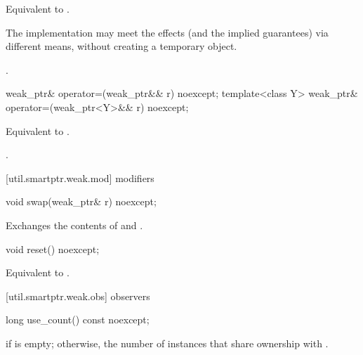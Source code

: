 \begin{itemdescr}
\pnum\effects  Equivalent to .

\pnum\remarks  The implementation may meet the effects (and the
implied guarantees) via different means, without creating a temporary object.

\pnum\returns  {}.
\end{itemdescr}

%
\begin{itemdecl}
weak_ptr& operator=(weak_ptr&& r) noexcept;
template<class Y> weak_ptr& operator=(weak_ptr<Y>&& r) noexcept;
\end{itemdecl}

\begin{itemdescr}
\pnum\effects  Equivalent to .

\pnum\returns  {}.
\end{itemdescr}

[util.smartptr.weak.mod]{ modifiers}
%
\begin{itemdecl}
void swap(weak_ptr& r) noexcept;
\end{itemdecl}

\begin{itemdescr}
\pnum\effects  Exchanges the contents of  and .
\end{itemdescr}

%
\begin{itemdecl}
void reset() noexcept;
\end{itemdecl}

\begin{itemdescr}
\pnum\effects  Equivalent to .
\end{itemdescr}

[util.smartptr.weak.obs]{ observers}
%
\begin{itemdecl}
long use_count() const noexcept;
\end{itemdecl}

\begin{itemdescr}
\pnum\returns  {} if  is empty;
otherwise, the number of  instances
that share ownership with .
\end{itemdescr}

